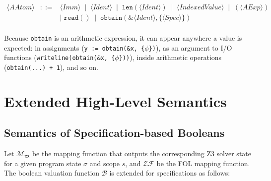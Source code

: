 \documentclass{article}
\begin{document}
\[
\begin{array}{rcl}
\langle \mathit{AAtom} \rangle
&::=&
\langle \mathit{Imm} \rangle
\;\mid\;
\langle \mathit{Ident} \rangle
\;\mid\;
\mathtt{len}(\langle \mathit{Ident} \rangle)
\;\mid\;
\langle \mathit{IndexedValue} \rangle
\;\mid\;
(\langle \mathit{AExp} \rangle) \\[2pt]
&& \mid\;
\mathtt{read}()
\;\mid\;
\mathbf{\mathtt{obtain}( \texttt{\&}\langle \mathit{Ident} \rangle, \textbf{\{} \langle \mathit{Spec} \rangle \textbf{\}} )} \\[4pt]
\end{array}
\]

Because \texttt{obtain} is an arithmetic expression, it can appear anywhere a value is expected: in assignments (\texttt{y := obtain(\&x, \{$\phi$\})}), as an argument to I/O functions (\texttt{writeline(obtain(\&x, \{$\phi$\}))}), inside arithmetic operations (\texttt{obtain(...) + 1}), and so on.

\section{Extended High-Level Semantics}

\subsection{Semantics of Specification-based Booleans}
Let $\mathcal{M}_{\mathtt{Z3}}$ be the mapping function that outputs the corresponding Z3 solver state for a given program state $\sigma$ and scope $s$, and $\mathcal{ZF}$ be the FOL mapping function. The boolean valuation function $\mathcal{B}$ is extended for specifications as follows:

\begin{table}[h!]
\centering
\renewcommand{\arraystretch}{1.6} 
\large 
{}
\end{table}
\end{document}
